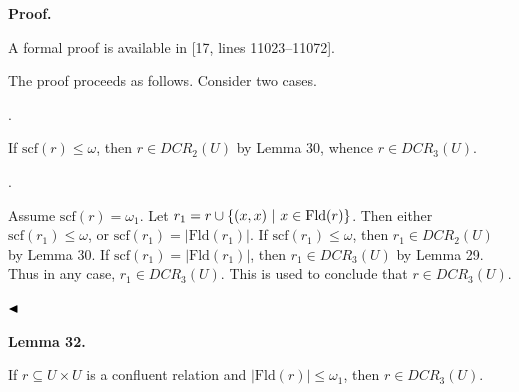 \documentclass[10pt,a4paper]{amsart}
\begin{document}
 
 
\par\medskip\noindent\textbf{Proof.}\par
 
 
A formal proof is available in [17, lines 11023–11072].\par
 
 
 
The proof proceeds as follows. Consider two cases.\par
  
\par{}. 
 
If $\mathrm{scf}(r)\leq\omega$, then $r\in DCR_{2}(U)$ by Lemma 30, whence $r\in DCR_{3}(U)$.\par
 
 
 
\par{}. 
 
Assume $\mathrm{scf}(r)=\omega_{1}$. Let $r_{1}=r\cup\{(x,x)\leavevmode\nobreak\ |\leavevmode\nobreak\ x\in\mathrm{Fld}(%
r)\}$. Then either $\mathrm{scf}(r_{1})\leq\omega$, or $\mathrm{scf}(r_{1})=|\mathrm{Fld}(r_{1})|$. If $\mathrm{scf}(r_{1})\leq\omega$, then $r_{1}\in DCR_{2}(U)$ by Lemma 30. If $\mathrm{scf}(r_{1})=|\mathrm{Fld}(r_{1})|$, then $r_{1}\in DCR_{3}(U)$ by Lemma 29. Thus in any case, $r_{1}\in DCR_{3}(U)$. This is used to conclude that $r\in DCR_{3}(U)$.\par
 
 
  
$\hfill\blacktriangleleft$\par
 
 
 
\par\medskip\noindent\textbf{Lemma 32.}\par
 
 
If $r\subseteq U\times U$ is a confluent relation and $|\mathrm{Fld}(r)|\leq\omega_{1}$, then $r\in DCR_{3}(U)$.\par
 
 
\end{document}
